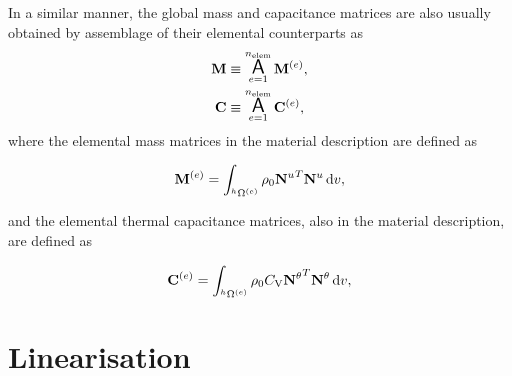 In a similar manner, the global mass and capacitance matrices are also usually obtained by assemblage of their elemental counterparts as
\begin{align}
  \mathbf M &\equiv \operatorname*{\text{\Large $ \mathsf{A} $}}_{e=1}^{n_\text{elem}} \mathbf M^{(e)},\\
  \mathbf C &\equiv \operatorname*{\text{\Large $ \mathsf{A} $}}_{e=1}^{n_\text{elem}} \mathbf C^{(e)},
\end{align}
where the elemental mass matrices in the material description are defined as
\begin{highlight}
  \begin{equation}
    \mathbf M^{(e)} = \int_{^h\Omega^{(e)}} \rho_0 {\mathbf N^u}^T\mathbf N^u\,\mathrm{d} v,
  \end{equation}
\end{highlight}
and the elemental thermal capacitance matrices, also in the material description, are defined as
\begin{highlight}
  \begin{equation}
    \mathbf C^{(e)} = \int_{^h\Omega^{(e)}} \rho_0 C_\mathrm{V} {\mathbf N^\theta}^T\mathbf N^\theta\,\mathrm{d} v,
  \end{equation}
\end{highlight}

\section{Linearisation}

